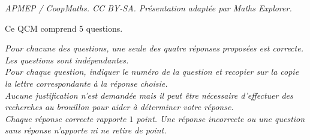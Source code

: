 \documentclass[10pt]{article}
\begin{document}
\noindent\textit{APMEP / CoopMaths. CC BY-SA. Présentation adaptée par Maths Explorer.}\par\medskip
\medskip

Ce QCM comprend 5 questions.

\emph{Pour chacune des questions, une seule des quatre réponses proposées est correcte.
Les questions sont indépendantes.\\
Pour chaque question, indiquer le numéro de la question et recopier sur la copie la lettre correspondante à la réponse choisie.\\
Aucune justification n'est demandée mais il peut être nécessaire d'effectuer des recherches au
brouillon pour aider à déterminer votre réponse.\\
Chaque réponse correcte rapporte $1$ point. Une réponse incorrecte ou une question sans réponse n'apporte ni ne retire de point.}

\medskip
\end{document}
